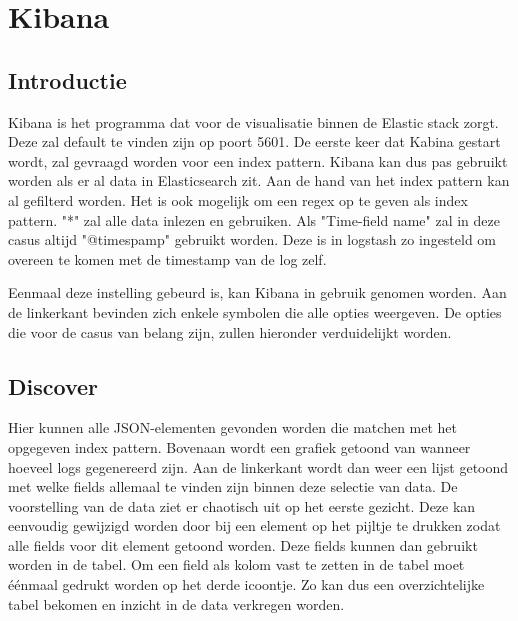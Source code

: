 
\chapter{Kibana}
\label{ch:kibana}

\section{Introductie}
\label{sec:introductie}
Kibana is het programma dat voor de visualisatie binnen de Elastic stack zorgt. Deze zal default te vinden zijn op poort 5601. 
De eerste keer dat Kabina gestart wordt, zal gevraagd worden voor een index pattern. Kibana kan dus pas gebruikt worden als er al data in Elasticsearch zit.
Aan de hand van het index pattern kan al gefilterd worden. Het is ook mogelijk om een regex op te geven als index pattern. "*" zal alle data inlezen en gebruiken. 
Als "Time-field name" zal in deze casus altijd "@timespamp" gebruikt worden. Deze is in logstash zo ingesteld om overeen te komen met de timestamp van de log zelf.

Eenmaal deze instelling gebeurd is, kan Kibana in gebruik genomen worden. Aan de linkerkant bevinden zich enkele symbolen die alle opties weergeven. 
De opties die voor de casus van belang zijn, zullen hieronder verduidelijkt worden.

\section{Discover}
\label{sec:discover}

Hier kunnen alle JSON-elementen gevonden worden die matchen met het opgegeven index pattern. Bovenaan wordt een grafiek getoond van wanneer hoeveel logs gegenereerd zijn. 
Aan de linkerkant wordt dan weer een lijst getoond met welke fields allemaal te vinden zijn binnen deze selectie van data. 
De voorstelling van de data ziet er chaotisch uit op het eerste gezicht. Deze kan eenvoudig gewijzigd worden door bij een element op het pijltje te drukken zodat alle fields voor dit element getoond worden.
Deze fields kunnen dan gebruikt worden in de tabel. Om een field als kolom vast te zetten in de tabel moet éénmaal gedrukt worden op het derde icoontje. 
Zo kan dus een overzichtelijke tabel bekomen en inzicht in de data verkregen worden.


